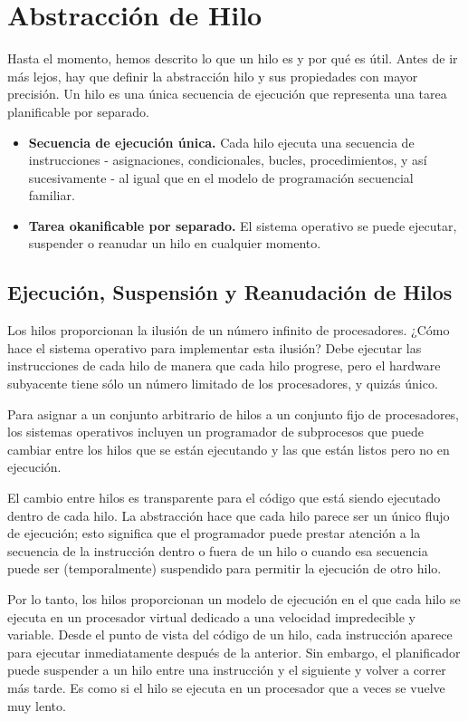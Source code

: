 \documentclass[10pt]{book}
\begin{document}
\section{Abstracción de Hilo}
Hasta el momento, hemos descrito lo que un hilo es y por qué es útil. Antes de ir más lejos, hay que definir la abstracción hilo y sus propiedades con mayor precisión. Un hilo es una única secuencia de ejecución que representa una tarea planificable por separado.

\begin{itemize}
\item  \textbf{Secuencia de ejecución única.} Cada hilo ejecuta una secuencia de instrucciones - asignaciones, condicionales, bucles, procedimientos, y así sucesivamente - al igual que en el modelo de programación secuencial familiar.
\item \textbf{Tarea okanificable por separado.} El sistema operativo se puede ejecutar, suspender o reanudar un hilo en cualquier momento.
\end{itemize}

\subsection{Ejecución, Suspensión y Reanudación de Hilos}
Los hilos proporcionan la ilusión de un número infinito de procesadores. ¿Cómo hace el sistema operativo para implementar esta ilusión? Debe ejecutar las instrucciones de cada hilo de manera que cada hilo progrese, pero el hardware subyacente tiene sólo un número limitado de los procesadores, y quizás único.

Para asignar a un conjunto arbitrario de hilos a un conjunto fijo de procesadores, los sistemas operativos incluyen un programador de subprocesos que puede cambiar entre los hilos que se están ejecutando y las que están listos pero no en ejecución.

El cambio entre hilos es transparente para el código que está siendo ejecutado dentro de cada hilo. La abstracción hace que cada hilo parece ser un único flujo de ejecución; esto significa que el programador puede prestar atención a la secuencia de la instrucción dentro o fuera de un hilo o cuando esa secuencia puede ser (temporalmente) suspendido para permitir la ejecución de otro hilo.

Por lo tanto, los hilos proporcionan un modelo de ejecución en el que cada hilo se ejecuta en un procesador virtual dedicado a una velocidad impredecible y variable. Desde el punto de vista del código de un hilo, cada instrucción aparece para ejecutar inmediatamente después de la anterior. Sin embargo, el planificador puede suspender a un hilo entre una instrucción y el siguiente y volver a correr más tarde. Es como si el hilo se ejecuta en un procesador que a veces se vuelve muy lento.
\end{document}
